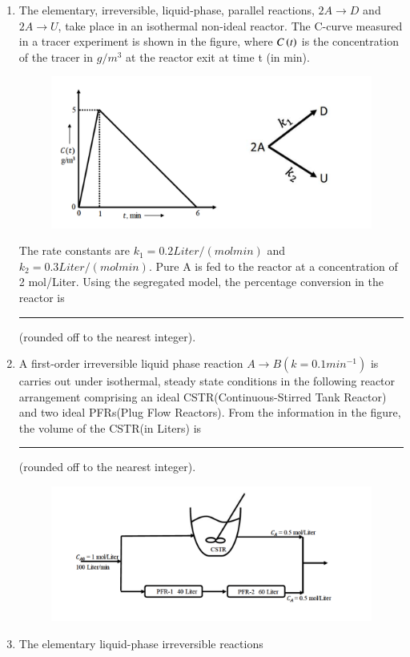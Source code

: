 \documentclass[journal,12pt,onecolumn]{IEEEtran}
\theoremstyle{remark}
\begin{document}
\begin{enumerate}
\hfill{}

    \item The elementary, irreversible, liquid-phase, parallel reactions, $2A \to D$ and $2A\to U$, take place in an isothermal non-ideal reactor. The C-curve measured in a tracer experiment is shown in the figure, where $C\left(t\right)$ is the concentration of the tracer in $g/m^3$ at the reactor exit at time t (in min). 

\hfill{}
\begin{figure}[H]
    \centering
    \includegraphics[width=0.9\columnwidth]{Fig/45.png}
    \caption{}
    \label{fig:45}
\end{figure}

    The rate constants are $k_1 = 0.2 Liter/(mol min)$ and $k_2 = 0.3 Liter/(mol min)$. Pure A is fed to the reactor at a concentration of 2 mol/Liter. Using the segregated model, the percentage conversion in the reactor is \rule{1.5cm}{0.1mm}(rounded off to the nearest integer).
    
\hfill{}
\newpage
    \item A first-order irreversible liquid phase reaction $A \to B(k = 0.1 min^{-1})$ is carries out under isothermal, steady state conditions in the following reactor arrangement comprising an ideal CSTR(Continuous-Stirred Tank Reactor) and two ideal PFRs(Plug Flow Reactors). From the information in the figure, the volume of the CSTR(in Liters) is \rule{1.5cm}{0.1mm}(rounded off to the nearest integer).
    
\hfill{}
\begin{figure}[H]
    \centering
    \includegraphics[width=0.6 \columnwidth]{Fig/46.png}
    \caption*{}
    \label{fig: 46}
\end{figure}
    \item 
        The elementary liquid-phase irreversible reactions 
    

\end{enumerate}
\end{document}
